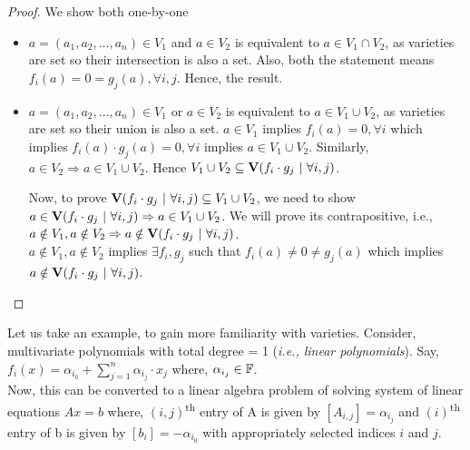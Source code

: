 \documentclass[a4paper,11pt]{article}
\begin{document}
\begin{proof}
We show both one-by-one
\begin{itemize}
    \item $a = (a_1, a_2, \ldots, a_n)\in V_1$ and $a \in V_2$ is equivalent to $a \in V_1 \cap V_2$, as varieties are set so their intersection is also a set. Also, both the statement means $f_i(a)=0=g_j(a), \forall i,j$. Hence, the result.

    \item $a = (a_1, a_2, \ldots, a_n)\in V_1$ or $a \in V_2$ is equivalent to $a \in V_1 \cup V_2$, as varieties are set so their union is also a set. $a \in V_1 $ implies $f_i(a)=0, \forall i$ which implies $f_i(a)\cdot g_j(a)=0, \forall i$ implies $a\in V_1 \cup V_2$. Similarly, $a \in V_2 \Rightarrow a \in V_1 \cup V_2$. Hence $V_1 \cup V_2 \subseteq \textbf{V}(f_i\cdot g_j \ | \ \forall i,j)$.

    Now, to prove $\V(f_i\cdot g_j \ | \ \forall i,j) \subseteq V_1 \cup V_2$, we need to show $a\in \textbf{V}(f_i\cdot g_j \ | \ \forall i,j) \Rightarrow a\in V_1 \cup V_2$. We will prove its contrapositive, i.e., $a\notin V_1, a\notin V_2 \Rightarrow a\notin \textbf{V}(f_i\cdot g_j \ | \ \forall i,j)$.\\
    $a\notin V_1, a\notin V_2$ implies $\exists f_i, g_j$ such that $f_i(a)\neq0\neq g_j(a)$ which implies $a\notin \V(f_i\cdot g_j \ | \ \forall i,j)$.
\end{itemize}
\end{proof}
Let us take an example, to gain more familiarity with varieties. Consider, multivariate polynomials with total degree = 1 (\emph{i.e., linear polynomials}). Say, $f_i(x) = \alpha_{i_0}+\displaystyle\sum_{j=1}^{n} \alpha_{i_j}\cdot x_j$ where, $\alpha_{i_j} \in \mathbb{F}$.\\
Now, this can be converted to a linear algebra problem of solving system of linear equations $Ax=b$ where, $(i,j)$\textsuperscript{th} entry of A is given by $[A_{i,j}] = \alpha_{i_j}$ and  $(i)$\textsuperscript{th} entry of b is given by $[b_{i}]=-\alpha_{i_0}$ with appropriately selected indices $i$ and $j$.
\end{document}
